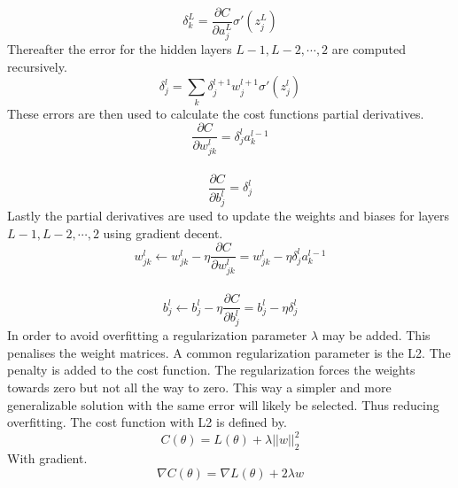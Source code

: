 \documentclass[12pt, letterpaper, twoside]{article}
\begin{document}
$$
\delta_k^L = \frac{\partial C}{\partial a_j^L}\sigma'(z_j^L)
$$
Thereafter the error for the hidden layers $L-1, L-2,\cdots,2$ are computed recursively.\\
$$
\delta_j^l = \sum_k \delta_j^{l+1} w_j^{l+1} \sigma'(z_j^{l})
$$
These errors are then used to calculate the cost functions partial derivatives.\\
$$
\frac{\partial C}{\partial w_{jk}^{l}} = \delta_j^l a_k^{l-1}
$$
\ \\
$$
\frac{\partial C}{\partial b_j^l} = \delta_j^l
$$
Lastly the partial derivatives are used to update the weights and biases for layers $L-1,L-2,\cdots,2$ using gradient decent.\\
$$
w_{jk}^l \leftarrow w_{jk}^l - \eta \frac{\partial C}{\partial w_{jk}^l}
= w_{jk}^l - \eta \delta_j^l a_{k}^{l-1}
$$
\ \\
$$
b_j^l \leftarrow b_j^l - \eta \frac{\partial C}{\partial b_j^l}
= b_j^l - \eta \delta_j^l
$$
In order to avoid overfitting a regularization parameter $\lambda$ may be added. This penalises the weight matrices. A common regularization parameter is the L2. The penalty is added to the cost function. The regularization forces the weights towards zero but not all the way to zero. This way a simpler and more generalizable solution with the same error will likely be selected. Thus reducing overfitting. The cost function with L2 is defined by.
$$
C(\theta) = L(\theta) + \lambda||w||_2^2
$$
With gradient.
$$
\nabla C(\theta) = \nabla L(\theta) + 2 \lambda w
$$
\ \\
\end{document}
